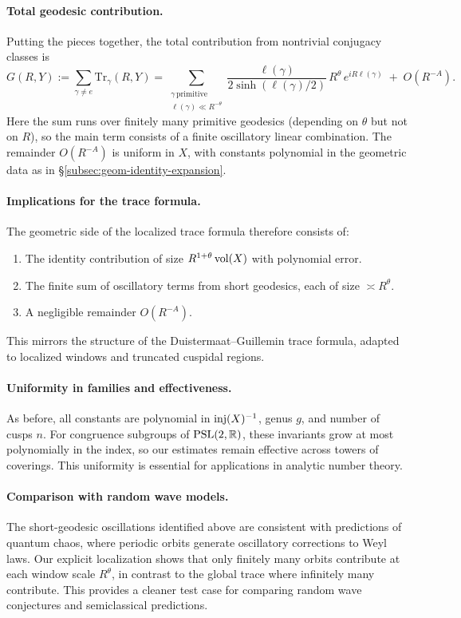 \paragraph{Total geodesic contribution.}
Putting the pieces together, the total contribution from nontrivial conjugacy classes is
\[
G(R,Y) := \sum_{\gamma\neq e} \mathrm{Tr}_\gamma(R,Y)
= \sum_{\substack{\gamma \,\text{primitive}\\ \ell(\gamma)\ll R^{-\theta}}} 
\frac{\ell(\gamma)}{2\sinh(\ell(\gamma)/2)} \, R^\theta\, e^{iR\ell(\gamma)} \;+\; O(R^{-A}).
\]
Here the sum runs over finitely many primitive geodesics (depending on $\theta$ but not on $R$), so the main term 
consists of a finite oscillatory linear combination. The remainder $O(R^{-A})$ is uniform in $X$, with constants 
polynomial in the geometric data as in \S\ref{subsec:geom-identity-expansion}. 

\paragraph{Implications for the trace formula.}
The geometric side of the localized trace formula therefore consists of:
\begin{enumerate}
\item The identity contribution of size $R^{1+\theta}\operatorname{vol}(X)$ with polynomial error. 
\item The finite sum of oscillatory terms from short geodesics, each of size $\asymp R^\theta$. 
\item A negligible remainder $O(R^{-A})$. 
\end{enumerate}
This mirrors the structure of the Duistermaat–Guillemin trace formula, adapted to localized windows and truncated 
cuspidal regions. 

\paragraph{Uniformity in families and effectiveness.}
As before, all constants are polynomial in $\mathrm{inj}(X)^{-1}$, genus $g$, and number of cusps $n$. For congruence 
subgroups of $\mathrm{PSL}(2,\mathbb{R})$, these invariants grow at most polynomially in the index, so our estimates remain effective 
across towers of coverings. This uniformity is essential for applications in analytic number theory. 

\paragraph{Comparison with random wave models.}
The short-geodesic oscillations identified above are consistent with predictions of quantum chaos, where periodic 
orbits generate oscillatory corrections to Weyl laws. Our explicit localization shows that only finitely many orbits 
contribute at each window scale $R^\theta$, in contrast to the global trace where infinitely many contribute. This 
provides a cleaner test case for comparing random wave conjectures and semiclassical predictions. 

